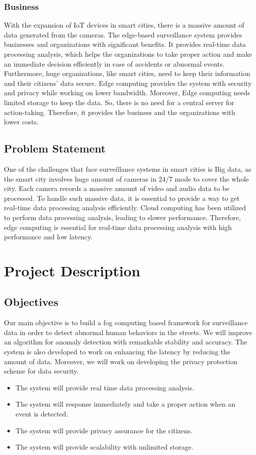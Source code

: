 \documentclass[12pt]{article}
\begin{document}
\subsubsection{Business}
With the expansion of IoT devices in smart cities, there is a massive amount of data generated from the cameras. The edge-based surveillance system provides businesses and organizations with significant benefits. It provides real-time data processing analysis, which helps the organizations to take proper action and make an immediate decision efficiently in case of accidents or abnormal events. Furthermore, huge organizations, like smart cities, need to keep their information and their citizens' data secure. Edge computing provides the system with security and privacy while working on lower bandwidth. Moreover, Edge computing needs limited storage to keep the data. So, there is no need for a central server for action-taking. Therefore, it provides the business and the organizations with lower costs.
\subsection{Problem Statement}
One of the challenges that face surveillance systems in smart cities is Big data, as the smart city involves huge amount of cameras in 24/7 mode to cover the whole city. Each camera records a massive amount of video and audio data to be processed. To handle such massive data, it is essential to provide a way to get real-time data processing analysis efficiently. Cloud computing has been utilized to perform data processing analysis, leading to slower performance. Therefore, edge computing is essential for real-time data processing analysis with high performance and low latency.


\section{Project Description}

\subsection{Objectives}
Our main objective is to build a fog computing based framework for surveillance data in order to detect abnormal human behaviors in the streets. We will improve an algorithm for anomaly detection  with remarkable stability and accuracy. The system is also developed to work on enhancing the latency by reducing the amount of data. Moreover, we will work on developing the privacy protection scheme for data security.
\begin{itemize}
\item The system will provide real time data processing analysis.

\item The system will response immediately and take a proper action when an event is detected.
\item The system will provide privacy assurance for the citizens.
\item The system will provide scalability with unlimited storage.
\end{itemize}
\end{document}
